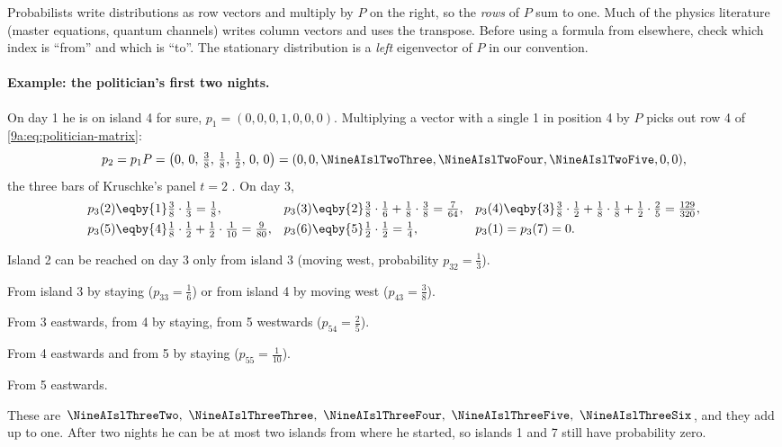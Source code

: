 \begin{pitfall}
Probabilists write distributions as row vectors and multiply by $P$ on the right, so the
\emph{rows} of $P$ sum to one. Much of the physics literature (master equations, quantum
channels) writes column vectors and uses the transpose. Before using a formula from elsewhere,
check which index is ``from'' and which is ``to''. The stationary distribution is a \emph{left}
eigenvector of $P$ in our convention.
\end{pitfall}

\paragraph{Example: the politician's first two nights.}
On day 1 he is on island 4 for sure, $p_1=(0,0,0,1,0,0,0)$. Multiplying a vector with a single
1 in position 4 by $P$ picks out row 4 of \eqref{9a:eq:politician-matrix}:
\begin{equation*}
  p_2=p_1P=\bigl(0,\,0,\,\tfrac38,\,\tfrac18,\,\tfrac12,\,0,\,0\bigr)
       =(0,0,\NineAIslTwoThree,\NineAIslTwoFour,\NineAIslTwoFive,0,0),
\end{equation*}
the three bars of Kruschke's panel $t=2$ . On day 3,
\begin{align*}
  p_3(2)&\eqby{1}\tfrac38\cdot\tfrac13=\tfrac18, &
  p_3(3)&\eqby{2}\tfrac38\cdot\tfrac16+\tfrac18\cdot\tfrac38=\tfrac{7}{64}, &
  p_3(4)&\eqby{3}\tfrac38\cdot\tfrac12+\tfrac18\cdot\tfrac18+\tfrac12\cdot\tfrac25=\tfrac{129}{320},\\
  p_3(5)&\eqby{4}\tfrac18\cdot\tfrac12+\tfrac12\cdot\tfrac1{10}=\tfrac{9}{80}, &
  p_3(6)&\eqby{5}\tfrac12\cdot\tfrac12=\tfrac14, &
  p_3(1)&=p_3(7)=0 .
\end{align*}
\begin{explain}
  \item Island 2 can be reached on day 3 only from island 3 (moving west, probability
        $p_{32}=\frac13$).
  \item From island 3 by staying ($p_{33}=\frac16$) or from island 4 by moving west
        ($p_{43}=\frac38$).
  \item From 3 eastwards, from 4 by staying, from 5 westwards ($p_{54}=\frac25$).
  \item From 4 eastwards and from 5 by staying ($p_{55}=\frac1{10}$).
  \item From 5 eastwards.
\end{explain}
These are $\NineAIslThreeTwo,\ \NineAIslThreeThree,\ \NineAIslThreeFour,\
\NineAIslThreeFive,\ \NineAIslThreeSix$, and they add up to one. After two nights he can be
at most two islands from where he started, so islands 1 and 7 still have probability zero.

